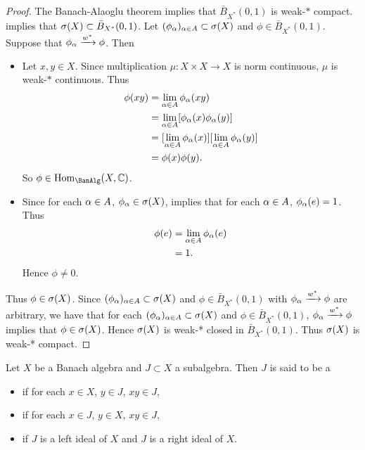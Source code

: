 \documentclass{book}
\begin{document}
	\begin{proof}
		The Banach-Alaoglu theorem   implies that $\bar{B}_{X^*}(0,1)$ is weak-$*$ compact. \rex{}  implies that $\sigma(X) \subset \bar{B}_{X^*}(0,1)$. Let $(\phi_{\alpha})_{\alpha \in A} \subset \sigma(X)$ and $\phi \in \bar{B}_{X^*}(0,1)$. Suppose that $\phi_{\alpha} \xrightarrow{w^*} \phi$. Then 
		\begin{itemize}
			\item Let $x, y \in X$. Since multiplication $\mu:X \times X \rightarrow X$ is norm continuous, $\mu$ is weak-$*$ continuous. Thus
			\begin{align*}
				\phi(xy)
				& = \lim_{\alpha \in A} \phi_{\alpha}(xy) \\
				& = \lim_{\alpha \in A} [\phi_{\alpha}(x) \phi_{\alpha}(y)] \\
				& = [\lim_{\alpha \in A} \phi_{\alpha}(x)] [\lim_{\alpha \in A} \phi_{\alpha}(y)] \\
				& = \phi(x) \phi(y).
			\end{align*} 
			So $\phi \in \Hom_{\BanAlg}(X, \C)$.
			\item Since for each $\alpha \in A$, $\phi_{\alpha} \in \sigma(X)$,   implies that for each $\alpha \in A$, $\phi_{\alpha}(e) = 1$. Thus 
			\begin{align*}
				\phi(e) 
				& = \lim_{\alpha \in A} \phi_{\alpha}(e) \\
				& = 1. 
			\end{align*}
			Hence $\phi \neq 0$. 
		\end{itemize}
		Thus $\phi \in \sigma(X)$. Since $(\phi_{\alpha})_{\alpha \in A} \subset \sigma(X)$ and $\phi \in \bar{B}_{X^*}(0,1)$ with $\phi_{\alpha} \xrightarrow{w^*} \phi$  are arbitrary, we have that for each $(\phi_{\alpha})_{\alpha \in A} \subset \sigma(X)$ and $\phi \in \bar{B}_{X^*}(0,1)$, $\phi_{\alpha} \xrightarrow{w^*} \phi$ implies that $\phi \in \sigma(X)$. Hence $\sigma(X)$ is weak-* closed in $\bar{B}_{X^*}(0,1)$. Thus $\sigma(X)$ is weak-* compact.
	\end{proof}

	\begin{defn}
		Let $X$ be a Banach algebra and $J \subset X$ a subalgebra. Then $J$ is said to be a 
		\begin{itemize}
			\item {} if for each $x \in X$, $y \in J$, $xy \in J$,
			\item {} if for each $x \in J$, $y \in X$, $xy \in J$,
			\item {} if $J$ is a left ideal of $X$ and $J$ is a right ideal of $X$.
		\end{itemize}
	\end{defn}
\end{document}
